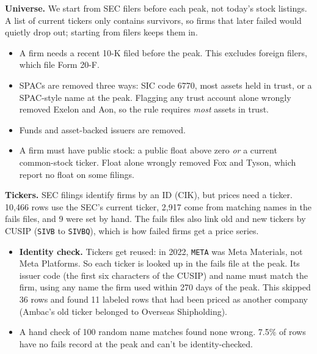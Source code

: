 \documentclass[11pt]{article}
\begin{document}
\textbf{Universe.} We start from SEC filers before each peak, not today's stock listings. A list of current tickers only contains survivors, so firms that later failed would quietly drop out; starting from filers keeps them in.
\begin{itemize}
  \item A firm needs a recent 10-K filed before the peak. This excludes foreign filers, which file Form 20-F.
  \item SPACs are removed three ways: SIC code 6770, most assets held in trust, or a SPAC-style name at the peak. Flagging any trust account alone wrongly removed Exelon and Aon, so the rule requires \emph{most} assets in trust.
  \item Funds and asset-backed issuers are removed.
  \item A firm must have public stock: a public float above zero \emph{or} a current common-stock ticker. Float alone wrongly removed Fox and Tyson, which report no float on some filings.
\end{itemize}

\textbf{Tickers.} SEC filings identify firms by an ID (CIK), but prices need a ticker. 10,466 rows use the SEC's current ticker, 2,917 come from matching names in the fails files, and 9 were set by hand. The fails files also link old and new tickers by CUSIP (\texttt{SIVB} to \texttt{SIVBQ}), which is how failed firms get a price series.
\begin{itemize}
  \item \textbf{Identity check.} Tickers get reused: in 2022, \texttt{META} was Meta Materials, not Meta Platforms. So each ticker is looked up in the fails file at the peak. Its issuer code (the first six characters of the CUSIP) and name must match the firm, using any name the firm used within 270 days of the peak. This skipped 36 rows and found 11 labeled rows that had been priced as another company (Ambac's old ticker belonged to Overseas Shipholding).
  \item A hand check of 100 random name matches found none wrong. 7.5\% of rows have no fails record at the peak and can't be identity-checked.
\end{itemize}
\end{document}
